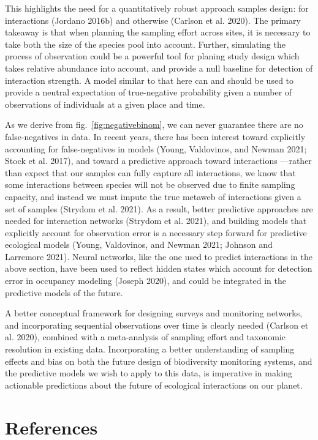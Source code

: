 \documentclass[11pt]{article}
\begin{document}
This highlights the need for a quantitatively robust approach samples
design: for interactions (Jordano 2016b) and otherwise (Carlson et al.
2020). The primary takeaway is that when planning the sampling effort
across sites, it is necessary to take both the size of the species pool
into account. Further, simulating the process of observation could be a
powerful tool for planing study design which takes relative abundance
into account, and provide a null baseline for detection of interaction
strength. A model similar to that here can and should be used to provide
a neutral expectation of true-negative probability given a number of
observations of individuals at a given place and time.

As we derive from fig.~\ref{fig:negativebinom}, we can never guarantee
there are no false-negatives in data. In recent years, there has been
interest toward explicitly accounting for false-negatives in models
(Young, Valdovinos, and Newman 2021; Stock et al. 2017), and toward a
predictive approach toward interactions ---rather than expect that our
samples can fully capture all interactions, we know that some
interactions between species will not be observed due to finite sampling
capacity, and instead we must impute the true metaweb of interactions
given a set of samples (Strydom et al. 2021). As a result, better
predictive approaches are needed for interaction networks (Strydom et
al. 2021), and building models that explicitly account for observation
error is a necessary step forward for predictive ecological models
(Young, Valdovinos, and Newman 2021; Johnson and Larremore 2021). Neural
networks, like the one used to predict interactions in the above
section, have been used to reflect hidden states which account for
detection error in occupancy modeling (Joseph 2020), and could be
integrated in the predictive models of the future.

A better conceptual framework for designing surveys and monitoring
networks, and incorporating sequential observations over time is clearly
needed (Carlson et al. 2020), combined with a meta-analysis of sampling
effort and taxonomic resolution in existing data. Incorporating a better
understanding of sampling effects and bias on both the future design of
biodiversity monitoring systems, and the predictive models we wish to
apply to this data, is imperative in making actionable predictions about
the future of ecological interactions on our planet.

\hypertarget{references}{%
\section*{References}\label{references}}
\end{document}
